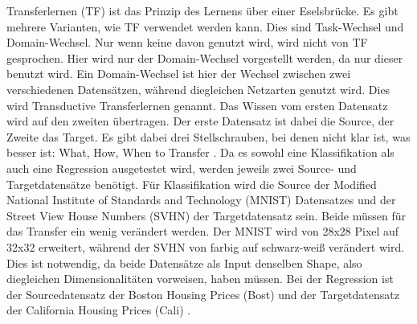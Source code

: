 Transferlernen (TF) ist das Prinzip des Lernens über einer Eselsbrücke. 
Es gibt mehrere Varianten, wie TF verwendet werden kann. Dies sind Task-Wechsel und Domain-Wechsel. 
Nur wenn keine davon genutzt wird, wird nicht von TF gesprochen. 
Hier wird nur der Domain-Wechsel vorgestellt werden, da nur dieser benutzt wird. Ein Domain-Wechsel ist hier der Wechsel 
zwischen zwei verschiedenen Datensätzen, während diegleichen Netzarten genutzt wird. 
Dies wird Transductive Transferlernen\cite{survey_transfer} genannt. 
Das Wissen vom ersten Datensatz wird auf den zweiten übertragen. Der erste Datensatz ist dabei die Source, der Zweite das Target. 
Es gibt dabei drei Stellschrauben, bei denen nicht klar ist, was besser ist: What, How, When to Transfer \cite{survey_transfer}. 
Da es sowohl eine Klassifikation als auch eine Regression ausgetestet wird, werden jeweils zwei Source- und Targetdatensätze benötigt. 
Für Klassifikation wird die Source der Modified National Institute of Standards and Technology \cite{handwritten_digit} (MNIST) Datensatzes  
und der 
Street View House Numbers (SVHN) \cite{house_numbers} der Targetdatensatz sein. Beide müssen für das Transfer ein wenig 
verändert werden. Der MNIST wird von 28x28 Pixel auf 32x32 erweitert, während der SVHN von farbig auf schwarz-weiß verändert wird. 
Dies ist notwendig, da beide Datensätze als Input denselben Shape, also diegleichen Dimensionalitäten vorweisen, haben müssen. 
Bei der Regression ist der Sourcedatensatz der Boston Housing Prices (Bost) \cite{Boston_housing} und der Targetdatensatz der 
California Housing Prices (Cali) \cite{California_housing}. 

